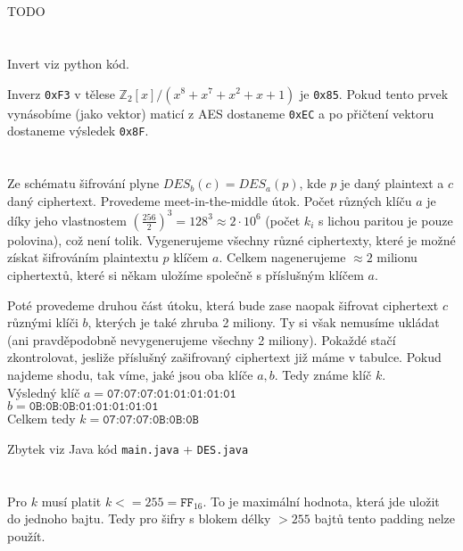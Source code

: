 \documentclass[12pt, a4paper]{article}
\begin{document}
\section{}
TODO

\section{}
Invert viz python kód.


Inverz \texttt{0xF3} v tělese $\mathbb{Z}_2[x]/(x^8+x^7+x^2+x+1)$ je \texttt{0x85}. Pokud tento prvek vynásobíme (jako vektor) maticí z AES dostaneme \texttt{0xEC} a po přičtení vektoru dostaneme výsledek \texttt{0x8F}.

\section{}
Ze schématu šifrování plyne $DES_{b}(c)=DES_{a}(p)$, kde $p$ je daný plaintext a $c$ daný ciphertext. Provedeme meet-in-the-middle útok. Počet různých klíču $a$ je díky jeho vlastnostem $(\frac{256}{2})^3=128^3\approx2\cdot 10^6$ (počet $k_i$ s lichou paritou je pouze polovina), což není tolik. Vygenerujeme všechny různé ciphertexty, které je možné získat šifrováním plaintextu $p$ klíčem $a$. Celkem nagenerujeme $\approx 2$ milionu ciphertextů, které si někam uložíme společně s příslušným klíčem $a$.

Poté provedeme druhou část útoku, která bude zase naopak šifrovat ciphertext $c$ různými klíči $b$, kterých je také zhruba 2 miliony. Ty si však nemusíme ukládat (ani pravděpodobně nevygenerujeme všechny 2 miliony). Pokaždé stačí zkontrolovat, jesliže příslušný zašifrovaný ciphertext již máme v tabulce. Pokud najdeme shodu, tak víme, jaké jsou oba klíče $a,b$. Tedy známe klíč $k$.\\
Výsledný klíč $a = \texttt{07:07:07:01:01:01:01:01}$\\
$b = \texttt{0B:0B:0B:01:01:01:01:01}$\\
Celkem tedy $k = \texttt{07:07:07:0B:0B:0B}$


Zbytek viz Java kód \texttt{main.java} + \texttt{DES.java}

\section{}
Pro $k$ musí platit $k<=255 = \texttt{FF}_{16}$. To je maximální hodnota, která jde uložit do jednoho bajtu. Tedy pro šifry s blokem délky $>255$ bajtů tento padding nelze použít.
\end{document}
